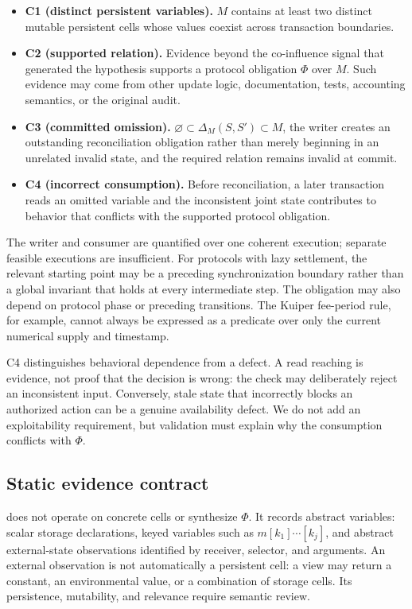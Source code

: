 \begin{itemize}[leftmargin=*,nosep]
  \item \textbf{C1 (distinct persistent variables).} \(M\) contains at least two distinct mutable persistent cells whose values coexist across transaction boundaries.
  \item \textbf{C2 (supported relation).} Evidence beyond the co-influence signal that generated the hypothesis supports a protocol obligation \(\Phi\) over \(M\). Such evidence may come from other update logic, documentation, tests, accounting semantics, or the original audit.
  \item \textbf{C3 (committed omission).} \(\varnothing\subset\Delta_M(S,S')\subset M\), the writer creates an outstanding reconciliation obligation rather than merely beginning in an unrelated invalid state, and the required relation remains invalid at commit.
  \item \textbf{C4 (incorrect consumption).} Before reconciliation, a later transaction reads an omitted variable and the inconsistent joint state contributes to behavior that conflicts with the supported protocol obligation.
\end{itemize}

The writer and consumer are quantified over one coherent execution; separate feasible executions are insufficient. For protocols with lazy settlement, the relevant starting point may be a preceding synchronization boundary rather than a global invariant that holds at every intermediate step. The obligation may also depend on protocol phase or preceding transitions. The Kuiper fee-period rule, for example, cannot always be expressed as a predicate over only the current numerical supply and timestamp.

C4 distinguishes behavioral dependence from a defect. A read reaching  is evidence, not proof that the decision is wrong: the check may deliberately reject an inconsistent input. Conversely, stale state that incorrectly blocks an authorized action can be a genuine availability defect. We do not add an exploitability requirement, but validation must explain why the consumption conflicts with \(\Phi\).

\subsection{Static evidence contract}
\label{s:program-model}

\sys does not operate on concrete cells or synthesize \(\Phi\). It records abstract variables: scalar storage declarations, keyed variables such as \(m[k_1]\cdots[k_j]\), and abstract external-state observations identified by receiver, selector, and arguments. An external observation is not automatically a persistent cell: a view may return a constant, an environmental value, or a combination of storage cells. Its persistence, mutability, and relevance require semantic review.

